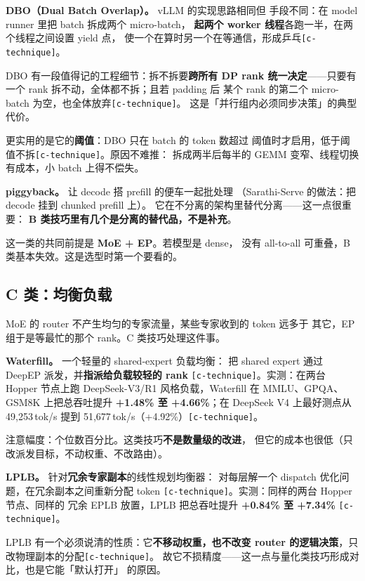 \noindent\textbf{DBO（Dual Batch Overlap）。} vLLM 的实现思路相同但
手段不同：在 model runner 里把 batch 拆成两个 micro-batch，
\textbf{起两个 worker 线程}各跑一半，在两个线程之间设置 yield 点，
使一个在算时另一个在等通信，形成乒乓\texttt{[c-technique]}。

\noindent DBO 有一段值得记的工程细节：拆不拆要\textbf{跨所有 DP rank
统一决定}——只要有一个 rank 拆不动，全体都不拆；且若 padding 后
某个 rank 的第二个 micro-batch 为空，也全体放弃\texttt{[c-technique]}。
这是「并行组内必须同步决策」的典型代价。

\noindent 更实用的是它的\textbf{阈值}：DBO 只在 batch 的 token 数超过
阈值时才启用，低于阈值不拆\texttt{[c-technique]}。原因不难推：
拆成两半后每半的 GEMM 变窄、线程切换有成本，小 batch 上得不偿失。

\noindent\textbf{piggyback。} 让 decode 搭 prefill 的便车一起批处理
（Sarathi-Serve 的做法：把 decode 挂到 chunked prefill 上）。
它在不分离的架构里替代分离——这一点很重要：
\textbf{B 类技巧里有几个是分离的替代品，不是补充}。

\noindent 这一类的共同前提是 \textbf{MoE + EP}。若模型是 dense，
没有 all-to-all 可重叠，B 类基本失效。这是选型时第一个要看的。

\subsection{C 类：均衡负载}

MoE 的 router 不产生均匀的专家流量，某些专家收到的 token 远多于
其它，EP 组于是等最忙的那个 rank。C 类技巧处理这件事。

\noindent\textbf{Waterfill。} 一个轻量的 shared-expert 负载均衡：
把 shared expert 通过 DeepEP 派发，并\textbf{指派给负载较轻的 rank}
\texttt{[c-technique]}。实测：在两台 Hopper 节点上跑 DeepSeek-V3/R1
风格负载，Waterfill 在 MMLU、GPQA、GSM8K 上把总吞吐提升
\textbf{+1.48\% 至 +4.66\%}；在 DeepSeek V4 上最好测点从
49{,}253\,tok/s 提到 51{,}677\,tok/s（+4.92\%）\texttt{[c-technique]}。

\noindent 注意幅度：个位数百分比。这类技巧\textbf{不是数量级的改进}，
但它的成本也很低（只改派发目标，不动权重、不改路由）。

\noindent\textbf{LPLB。} 针对\textbf{冗余专家副本}的线性规划均衡器：
对每层解一个 dispatch 优化问题，在冗余副本之间重新分配 token
\texttt{[c-technique]}。实测：同样的两台 Hopper 节点、同样的
冗余 EPLB 放置，LPLB 把总吞吐提升 \textbf{+0.84\% 至 +7.34\%}
\texttt{[c-technique]}。

\noindent LPLB 有一个必须说清的性质：它\textbf{不移动权重，也不改变
router 的逻辑决策}，只改物理副本的分配\texttt{[c-technique]}。
故它不损精度——这一点与量化类技巧形成对比，也是它能「默认打开」
的原因。


